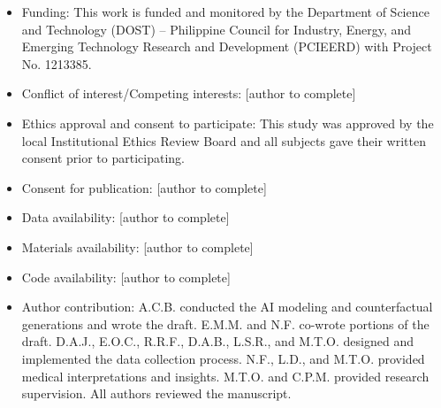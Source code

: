 \documentclass[pdflatex,sn-vancouver-num]{sn-jnl}
\begin{document}
\begin{itemize}
\item Funding: This work is funded and monitored by the Department of Science and Technology (DOST) -- Philippine Council for Industry, Energy, and Emerging Technology Research and Development (PCIEERD) with Project No. 1213385.
\item Conflict of interest/Competing interests: [author to complete]
\item Ethics approval and consent to participate: This study was approved by the local Institutional Ethics Review Board and all subjects gave their written consent prior to participating.
\item Consent for publication: [author to complete]
\item Data availability: [author to complete]
\item Materials availability: [author to complete]
\item Code availability: [author to complete]
\item Author contribution: A.C.B. conducted the AI modeling and counterfactual generations and wrote the draft. E.M.M. and N.F. co-wrote portions of the draft. D.A.J., E.O.C., R.R.F., D.A.B., L.S.R., and M.T.O. designed and implemented the data collection process. N.F., L.D., and M.T.O. provided medical interpretations and insights. M.T.O. and C.P.M. provided research supervision. All authors reviewed the manuscript.
\end{itemize}
\end{document}

